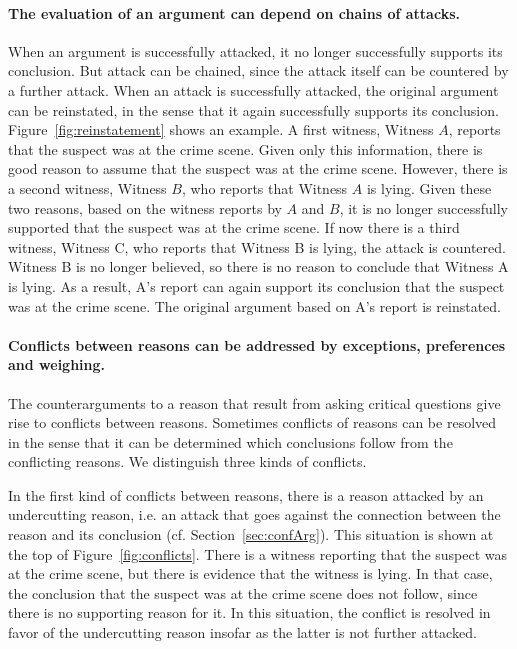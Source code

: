 \documentclass[10pt]{article}
\begin{document}
\paragraph{The evaluation of an argument can depend on chains of attacks.} When an argument is successfully attacked, it no longer successfully supports its conclusion. But attack can be chained, since the attack itself can be countered by a further attack. When an attack is successfully attacked, the original argument can be reinstated, in the sense that it again successfully supports its conclusion. Figure~\ref{fig:reinstatement} shows an example. A first witness, Witness $A$, reports that the suspect was at the crime scene. Given only this information, there is good reason to assume that the suspect was at the crime scene. However, there is a second witness, Witness $B$, who reports that Witness $A$ is lying. Given these two reasons, based on the witness reports by $A$ and $B$, it is no longer successfully supported that the suspect was at the crime scene. If now there is a third witness, Witness C, who reports that Witness B is lying, the attack is countered. Witness B is no longer believed, so there is no reason to conclude that Witness A is lying. As a result, A's report can again support its conclusion that the suspect was at the crime scene. The original argument based on A's report is reinstated. 

\paragraph{Conflicts between reasons can be addressed by exceptions, preferences and weighing.} The counterarguments to a reason that result from asking critical questions give rise to conflicts between reasons. Sometimes conflicts of reasons can be resolved in the sense that it can be determined which conclusions follow from the conflicting reasons. We distinguish three kinds of conflicts. 

In the first kind of conflicts between reasons, there is a reason attacked by an undercutting reason, i.e. an attack that goes against the connection between the reason and its conclusion (cf. Section~\ref{sec:confArg}). This situation is shown at the top of Figure~\ref{fig:conflicts}. There is a witness reporting that the suspect was at the crime scene, but there is evidence that the witness is lying. 
In that case, the conclusion that the suspect was at the crime scene does not follow, since there is no supporting reason for it. 
In this situation, %
the conflict %
is resolved in favor of the undercutting reason %
insofar as the latter is not further attacked.
\end{document}
